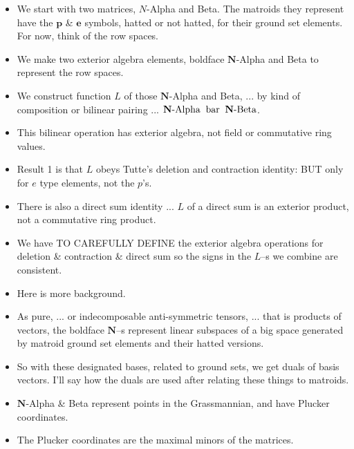 \documentclass[14pt]{extarticle}
\begin{document}
{\bf
  \begin{itemize}
  \item We start with two matrices, $N$-Alpha and Beta.  The matroids
    they represent have the $\mathbf{p}$ \& $\mathbf{e}$ symbols, hatted or
    not hatted, for their ground set elements.  For now, think of the
    row spaces.

  \item We make two exterior algebra elements,  boldface
    $\mathbf{N}$-Alpha and Beta to represent the row spaces.

  \item We construct function $L$ of those
    $\mathbf{N}$-Alpha and Beta, ... by 
    kind of composition or bilinear pairing ... 
  $\mathbf{N}\text{-Alpha} \text{\;\;bar\;\;} \mathbf{N}\text{-Beta}$.

  \item This bilinear operation has exterior algebra,
    not field or commutative ring values. 

\item Result 1 is that $L$ obeys Tutte's deletion and contraction identity:  BUT
  only for $e$ type elements, not the $p$'s.  

\item There is also a direct sum identity ... $L$ of a direct sum is an exterior product, not
  a commutative ring product.

\item We have TO CAREFULLY DEFINE the exterior algebra operations for deletion \&
  contraction \& direct sum so the signs in the $L$--s we combine are consistent.

\item Here is more background.
  
\item
  As pure, ... or indecomposable anti-symmetric tensors, ... that is 
  products of vectors, the boldface
  $\mathbf{N}$--s represent linear subspaces of a big space generated
  by matroid ground set elements and their hatted versions.  

\item  So with these designated bases, related to ground sets, we get duals of basis vectors.
  I'll say how the duals are used after relating these things to matroids.

\item
  $\mathbf{N}$-Alpha \& Beta represent points in the
  Grassmannian, and have Plucker coordinates.

\item
  The Plucker coordinates are the maximal minors of the matrices.


\end{itemize}}
\end{document}
